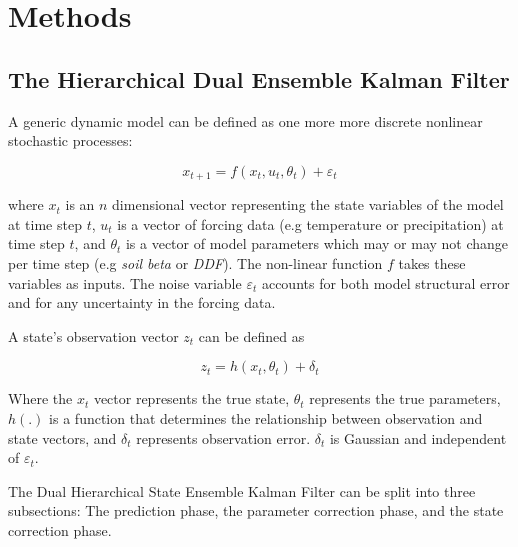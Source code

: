 \chapter{Methods}


\section{The Hierarchical Dual Ensemble Kalman Filter}

A generic dynamic model can be defined as one more more discrete nonlinear stochastic processes\cite{Chen2008}:

\begin{equation}\label{eq:gen_stoc}
x_{t+1} = f(x_{t}, u_{t}, \theta_{t}) + \varepsilon_{t}
\end{equation}

where $x_{t}$ is an $n$ dimensional vector representing the state variables of the model at time step $t$, $u_{t}$ is a vector of forcing data (e.g temperature or precipitation) at time step $t$, and $\theta_{t}$ is a vector of model parameters which may or may not change per time step (e.g \textit{soil beta }or \textit{DDF}). The non-linear function $f$ takes these variables as inputs. The noise variable $\varepsilon_{t}$ accounts for both model structural error and for any uncertainty in the forcing data.

A state's observation vector $z_{t}$ can be defined as

\begin{equation}\label{eq:gen_obs}
z_{t} = h(x_{t}, \theta_{t}) + \delta_{t}
\end{equation}

Where the $x_{t}$ vector represents the true state, $\theta_{t}$ represents the true parameters, $h(.)$ is a function that determines the relationship between observation and state vectors, and $\delta_{t}$ represents observation error. $\delta_{t}$ is Gaussian and independent of $\varepsilon_{t}$.

The Dual Hierarchical State Ensemble Kalman Filter can be split into three subsections: The prediction phase, the parameter correction phase, and the state correction phase. 

